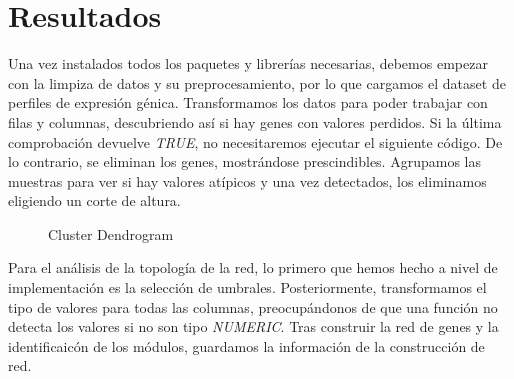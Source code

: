 
\section{Resultados}

Una vez instalados todos los paquetes y librerías necesarias, debemos empezar con la limpiza de datos y su preprocesamiento, por lo que cargamos el dataset de perfiles de expresión génica. Transformamos los datos para poder trabajar con filas y columnas, descubriendo así si hay genes con valores perdidos. Si la última comprobación devuelve \textit{TRUE}, no necesitaremos ejecutar el siguiente código. De lo contrario, se eliminan los genes, mostrándose prescindibles. Agrupamos las muestras para ver si hay valores atípicos y una vez detectados, los eliminamos eligiendo un corte de altura. 

\begin{figure}[!]
	\caption{Cluster Dendrogram}
	\label{fig:clusterDendrogram}
\end{figure}

Para el análisis de la topología de la red, lo primero que hemos hecho a nivel de implementación es la selección de umbrales. Posteriormente, transformamos el tipo de valores para todas las columnas, preocupándonos de que una función no detecta los valores si no son tipo \textit{NUMERIC}. Tras construir la red de genes y la identificaicón de los módulos, guardamos la información de la construcción de red.